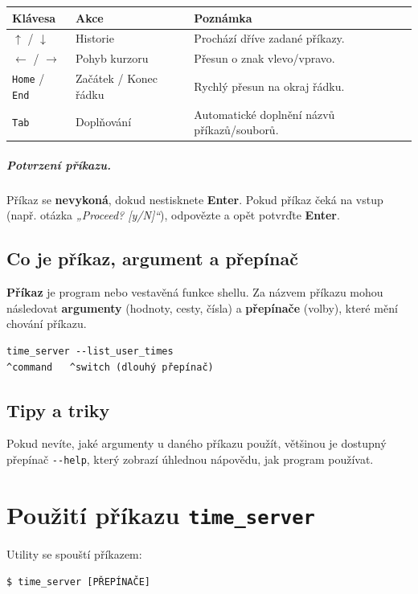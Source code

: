 \documentclass[11pt,a4paper]{book}
\begin{document}
\begin{longtable}{@{}llp{8cm}@{}}
\toprule
\textbf{Klávesa} & \textbf{Akce} & \textbf{Poznámka} \\
\midrule
\texttt{$\uparrow$} / \texttt{$\downarrow$} & Historie & Prochází dříve zadané příkazy. \\
\texttt{$\leftarrow$} / \texttt{$\rightarrow$} & Pohyb kurzoru & Přesun o znak vlevo/vpravo. \\
\texttt{Home} / \texttt{End} & Začátek / Konec řádku & Rychlý přesun na okraj řádku. \\
\texttt{Tab} & Doplňování & Automatické doplnění názvů příkazů/souborů. \\
\bottomrule
\end{longtable}

\paragraph{Potvrzení příkazu.}
Příkaz se \textbf{nevykoná}, dokud nestisknete \textbf{Enter}. Pokud příkaz čeká na vstup 
(např. otázka \emph{„Proceed? [y/N]“}), odpovězte a opět potvrďte \textbf{Enter}.
\newpage
\section{Co je příkaz, argument a přepínač}
\noindent
\textbf{Příkaz} je program nebo vestavěná funkce shellu. Za názvem příkazu mohou následovat 
\textbf{argumenty} (hodnoty, cesty, čísla) a \textbf{přepínače} (volby), které mění chování příkazu.

\begin{verbatim}
time_server --list_user_times
^command   ^switch (dlouhý přepínač)
\end{verbatim}

\section{Tipy a triky}
Pokud nevíte, jaké argumenty u daného příkazu použít, většinou je dostupný přepínač \texttt{{-}{-}help}, který zobrazí úhlednou nápovědu, jak program používat.



\mainmatter
\chapter{Použití příkazu \texttt{time\_server}}
Utility se spouští příkazem:
\begin{verbatim}
$ time_server [PŘEPÍNAČE]
\end{verbatim}
\end{document}
